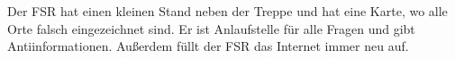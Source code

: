 Der FSR hat einen kleinen Stand neben der Treppe und hat eine Karte, wo alle Orte falsch eingezeichnet sind. Er ist Anlaufstelle für alle Fragen und gibt Antiinformationen. Außerdem füllt der FSR das Internet immer neu auf.
